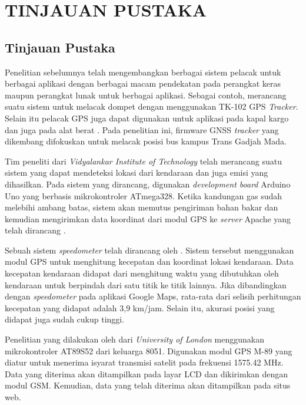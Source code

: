 \chapter{TINJAUAN PUSTAKA}

\section{Tinjauan Pustaka}
Penelitian sebelumnya telah mengembangkan berbagai sistem pelacak untuk berbagai aplikasi dengan berbagai macam pendekatan pada perangkat keras maupun perangkat lunak untuk berbagai aplikasi. Sebagai contoh, \cite{Ekhsan2022} merancang suatu sistem untuk melacak dompet dengan menggunakan TK-102 GPS \textit{Tracker}. Selain itu pelacak GPS juga dapat digunakan untuk aplikasi pada kapal kargo dan juga pada alat berat \cite{Zhang2013}\cite{Rani2021}. Pada penelitian ini, firmware GNSS \textit{tracker} yang dikembang difokuskan untuk melacak posisi bus kampus Trans Gadjah Mada.

Tim peneliti dari \textit{Vidyalankar Institute of Technology} telah merancang suatu sistem yang dapat mendeteksi lokasi dari kendaraan dan juga emisi  yang dihasilkan. Pada sistem yang dirancang, digunakan \textit{development board} Arduino Uno yang berbasis mikrokontroler ATmega328. Ketika kandungan gas  sudah melebihi ambang batas, sistem akan memutus pengiriman bahan bakar dan kemudian mengirimkan data koordinat dari modul GPS ke \textit{server} Apache yang telah dirancang \cite{Asha2022}.

Sebuah sistem \textit{speedometer} telah dirancang oleh \cite{Najmurrokhman2021}. Sistem tersebut menggunakan modul GPS untuk menghitung kecepatan dan koordinat lokasi kendaraan. Data kecepatan kendaraan didapat dari menghitung waktu yang dibutuhkan oleh kendaraan untuk berpindah dari satu titik ke titik lainnya. Jika dibandingkan dengan \textit{speedometer} pada aplikasi Google Maps, rata-rata dari selisih perhitungan kecepatan yang didapat adalah 3,9 km/jam. Selain itu, akurasi posisi yang didapat juga sudah cukup tinggi.

Penelitian yang dilakukan oleh \cite{Mukhtar2015} dari \textit{University of London} menggunakan mikrokontroler AT89S52 dari keluarga 8051. Digunakan modul GPS M-89 yang diatur untuk menerima isyarat transmisi satelit pada frekuensi 1575.42 MHz. Data yang diterima akan ditampilkan pada layar LCD dan dikirimkan dengan modul GSM. Kemudian, data yang telah diterima akan ditampilkan pada situs web.

